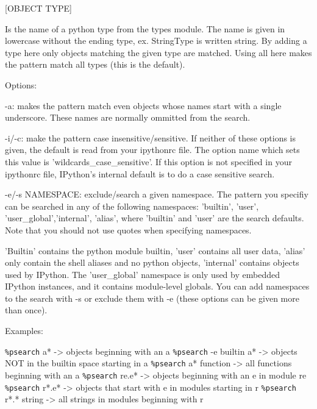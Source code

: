           [OBJECT TYPE]

          Is the name of a python type from the types module. The name is
          given in lowercase without the ending type, ex. StringType is
          written string. By adding a type here only objects matching the
          given type are matched. Using all here makes the pattern match all
          types (this is the default).

        Options:

          -a: makes the pattern match even objects whose names start with a
          single underscore.  These names are normally ommitted from the
          search.

          -i/-c: make the pattern case insensitive/sensitive.  If neither of
          these options is given, the default is read from your ipythonrc
          file.  The option name which sets this value is
          'wildcards\_case\_sensitive'.  If this option is not specified in your
          ipythonrc file, IPython's internal default is to do a case sensitive
          search.

          -e/-s NAMESPACE: exclude/search a given namespace.  The pattern you
          specifiy can be searched in any of the following namespaces:
          'builtin', 'user', 'user\_global','internal', 'alias', where
          'builtin' and 'user' are the search defaults.  Note that you should
          not use quotes when specifying namespaces.

          'Builtin' contains the python module builtin, 'user' contains all
          user data, 'alias' only contain the shell aliases and no python
          objects, 'internal' contains objects used by IPython.  The
          'user\_global' namespace is only used by embedded IPython instances,
          and it contains module-level globals.  You can add namespaces to the
          search with -s or exclude them with -e (these options can be given
          more than once).
    
        Examples:
       
        \texttt{\%psearch} a*            -> objects beginning with an a
        \texttt{\%psearch} -e builtin a* -> objects NOT in the builtin space starting in a
        \texttt{\%psearch} a* function   -> all functions beginning with an a
        \texttt{\%psearch} re.e*         -> objects beginning with an e in module re
        \texttt{\%psearch} r*.e*         -> objects that start with e in modules starting in r
        \texttt{\%psearch} r*.* string   -> all strings in modules beginning with r


